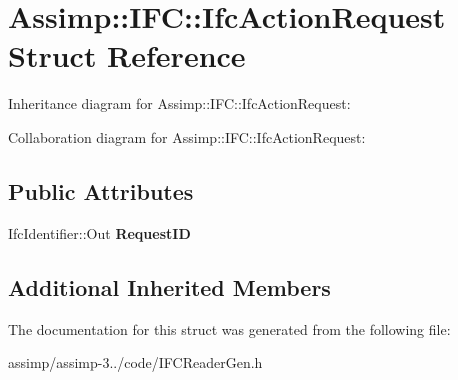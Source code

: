 \hypertarget{struct_assimp_1_1_i_f_c_1_1_ifc_action_request}{\section{Assimp\+:\+:I\+F\+C\+:\+:Ifc\+Action\+Request Struct Reference}
\label{struct_assimp_1_1_i_f_c_1_1_ifc_action_request}
}


Inheritance diagram for Assimp\+:\+:I\+F\+C\+:\+:Ifc\+Action\+Request\+:


Collaboration diagram for Assimp\+:\+:I\+F\+C\+:\+:Ifc\+Action\+Request\+:
\subsection*{Public Attributes}
\begin{DoxyCompactItemize}
\item 
\hypertarget{struct_assimp_1_1_i_f_c_1_1_ifc_action_request_a6ccbe3dff717513d2d1825d0d2045154}{Ifc\+Identifier\+::\+Out {\bfseries Request\+I\+D}}\label{struct_assimp_1_1_i_f_c_1_1_ifc_action_request_a6ccbe3dff717513d2d1825d0d2045154}

\end{DoxyCompactItemize}
\subsection*{Additional Inherited Members}


The documentation for this struct was generated from the following file\+:\begin{DoxyCompactItemize}
\item 
assimp/assimp-\/3../code/I\+F\+C\+Reader\+Gen.\+h\end{DoxyCompactItemize}
